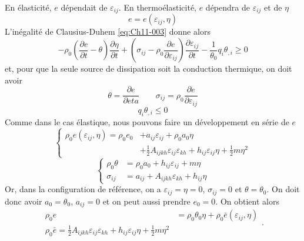 En élasticité, $e$ dépendait de $\varepsilon_{ij}$.
En thermoélasticité, $e$ dépendra de $\varepsilon_{ij}$ et de $\eta$ 
\begin{equation}
    e=e(\varepsilon_{ij},\eta)
    \label{eq:Ch11-004}
\end{equation}
L'inégalité de Clausius-Duhem \eqref{eq:Ch11-003} donne alors 
\begin{equation}
    -\rho_0 \left(\frac{\partial e}{\partial t} - \theta \right) \frac{\partial \eta}{\partial t} + \left(\sigma_{ij} -\rho_0\frac{\partial e}{\partial \varepsilon_{ij}}\right)\frac{\partial \varepsilon_{ij}}{\partial t} - \frac{1}{\theta_0} q_i \theta_{,i} \geq 0
    \label{eq:Ch11-005}
\end{equation}
et, pour que la seule source de dissipation soit la conduction thermique, on doit avoir 
\begin{equation}
    \theta=\frac{\partial e}{\partial eta}\qquad \sigma_{ij} =\rho_0\frac{\partial e}{\partial \varepsilon_{ij}}
    \label{eq:Ch11-006}
\end{equation}
\begin{equation}
    q_i \theta_{,i}\leq 0
    \label{eq:Ch11-007}
\end{equation}
Comme dans le cas élastique, nous pouvons faire un développement en série de $e$ 
\begin{equation}
  \left\{
  \begin{aligned}
    \rho_0 e(\varepsilon_{ij},\eta) = \rho_0 e_0 & + a_{ij} \varepsilon_{ij} +\rho_0 a_0 \eta \\
                                                 & + \frac{1}{2} A_{ijkh} \varepsilon_{ij}\varepsilon_{kh} + h_{ij} \varepsilon_{ij} \eta + \frac{1}{2} m \eta^2
  \end{aligned}
  \right.
    \label{eq:Ch11-008}
\end{equation}
\begin{equation}
  \left\{
  \begin{aligned}
    \rho_0 \theta & = \rho_0 a_0 + h_{ij} \varepsilon_{ij} + m \eta \\
    \sigma_{ij}   & = a_{ij} + A_{ijkh} \varepsilon_{kh} + h_{ij} \eta
  \end{aligned}
  \right.
    \label{eq:Ch11-009}
\end{equation}
Or, dans la configuration de référence, on a $\varepsilon_{ij}=\eta=0$, $\sigma_{ij}=0$ et $\theta=\theta_0$.
On doit donc avoir $a_0 = \theta_0$, $a_{ij}=0$ et on peut aussi prendre $e_0=0$.
On obtient alors 
\begin{equation}
  \begin{aligned}
    \rho_0 e & = \rho_0 \theta_0 \eta + \rho_0 \bar{e}(\varepsilon_{ij},\eta) \\
    \rho_0 \bar{e} = \frac{1}{2} A_{ijkh} \varepsilon_{ij}\varepsilon_{kh} + h_{ij} \varepsilon_{ij}\eta + \frac{1}{2} m \eta^2
  \end{aligned}.
    \label{eq:Ch11-010}
\end{equation}
